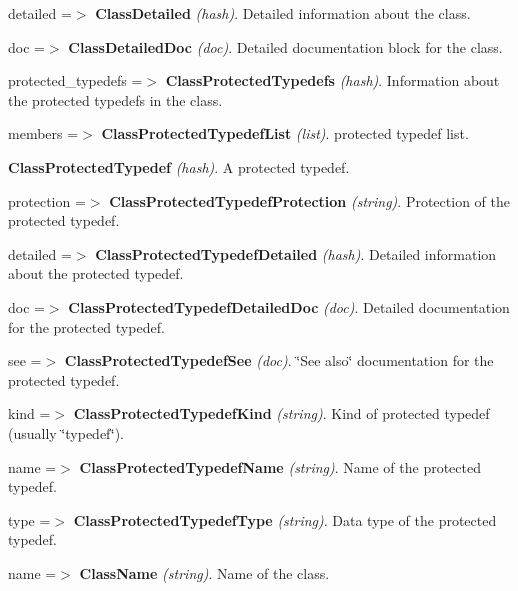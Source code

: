 \begin{DoxyItemize}
\begin{DoxyItemize}
\begin{DoxyItemize}
\begin{DoxyItemize}
\begin{DoxyItemize}
\end{DoxyItemize}
\item detailed =$>$ {\bfseries ClassDetailed} {\itshape (hash)\/}. Detailed information about the class. 
\begin{DoxyItemize}
\item doc =$>$ {\bfseries ClassDetailedDoc} {\itshape (doc)\/}. Detailed documentation block for the class. 
\end{DoxyItemize}
\item protected\_\-typedefs =$>$ {\bfseries ClassProtectedTypedefs} {\itshape (hash)\/}. Information about the protected typedefs in the class. 
\begin{DoxyItemize}
\item members =$>$ {\bfseries ClassProtectedTypedefList} {\itshape (list)\/}. protected typedef list. 
\begin{DoxyItemize}
\item {\bfseries ClassProtectedTypedef} {\itshape (hash)\/}. A protected typedef. 
\begin{DoxyItemize}
\item protection =$>$ {\bfseries ClassProtectedTypedefProtection} {\itshape (string)\/}. Protection of the protected typedef. 
\item detailed =$>$ {\bfseries ClassProtectedTypedefDetailed} {\itshape (hash)\/}. Detailed information about the protected typedef. 
\begin{DoxyItemize}
\item doc =$>$ {\bfseries ClassProtectedTypedefDetailedDoc} {\itshape (doc)\/}. Detailed documentation for the protected typedef. 
\item see =$>$ {\bfseries ClassProtectedTypedefSee} {\itshape (doc)\/}. \char`\"{}See also\char`\"{} documentation for the protected typedef. 
\end{DoxyItemize}
\item kind =$>$ {\bfseries ClassProtectedTypedefKind} {\itshape (string)\/}. Kind of protected typedef (usually \char`\"{}typedef\char`\"{}). 
\item name =$>$ {\bfseries ClassProtectedTypedefName} {\itshape (string)\/}. Name of the protected typedef. 
\item type =$>$ {\bfseries ClassProtectedTypedefType} {\itshape (string)\/}. Data type of the protected typedef. 
\end{DoxyItemize}
\end{DoxyItemize}
\end{DoxyItemize}
\item name =$>$ {\bfseries ClassName} {\itshape (string)\/}. Name of the class. 

\end{DoxyItemize}
\end{DoxyItemize}
\end{DoxyItemize}
\end{DoxyItemize}
